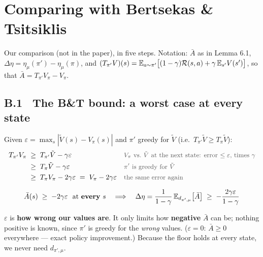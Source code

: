 \section{Comparing with Bertsekas \& Tsitsiklis}
\label{app:bt}

Our comparison (not in the paper), in five steps. Notation: $\bar A$ as in Lemma 6.1, $\Delta\eta=\eta_\mu(\pi')-\eta_\mu(\pi)$, and $(T_{\pi'}V)(s)=\mathbb{E}_{a\sim\pi'}\big[(1-\gamma)\mathcal R(s,a)+\gamma\,\mathbb{E}_{s'}V(s')\big]$, so that $\bar A=T_{\pi'}V_\pi-V_\pi$.

\subsection*{B.1 \ The B\&T bound: a worst case at every state}

Given $\varepsilon=\max_s|\tilde V(s)-V_\pi(s)|$ and $\pi'$ greedy for $\tilde V$ (i.e.\ $T_{\pi'}\tilde V\ge T_\pi\tilde V$):
\begin{gather*}
  \begin{aligned}
    T_{\pi'}V_\pi \;&\ge\; T_{\pi'}\tilde V - \gamma\varepsilon && \text{\small\color{NoteGray}$V_\pi$ vs.\ $\tilde V$ at the next state: error $\le\varepsilon$, times $\gamma$}\\
    &\ge\; T_{\pi}\tilde V - \gamma\varepsilon && \text{\small\color{NoteGray}$\pi'$ is greedy for $\tilde V$}\\
    &\ge\; T_\pi V_\pi - 2\gamma\varepsilon \;=\; V_\pi - 2\gamma\varepsilon && \text{\small\color{NoteGray}the same error again}
  \end{aligned}
\end{gather*}
\begin{eqbox}
\begin{gather*}
  \bar A(s) \;\ge\; -2\gamma\varepsilon \ \ \text{at \textbf{every} } s
  \quad\Longrightarrow\quad
  \Delta\eta = \frac{1}{1-\gamma}\,\mathbb{E}_{d_{\pi',\mu}}\big[\bar A\big] \;\ge\; -\frac{2\gamma\varepsilon}{1-\gamma}
\end{gather*}
\end{eqbox}
\begin{warnbox}[title={Only a floor}]
$\varepsilon$ is \textbf{how wrong our values are}. It only limits how \textbf{negative} $\bar A$ can be; nothing positive is known, since $\pi'$ is greedy for the \emph{wrong} values. ($\varepsilon=0$: $\bar A\ge0$ everywhere --- exact policy improvement.) Because the floor holds at every state, we never need $d_{\pi',\mu}$.
\end{warnbox}

